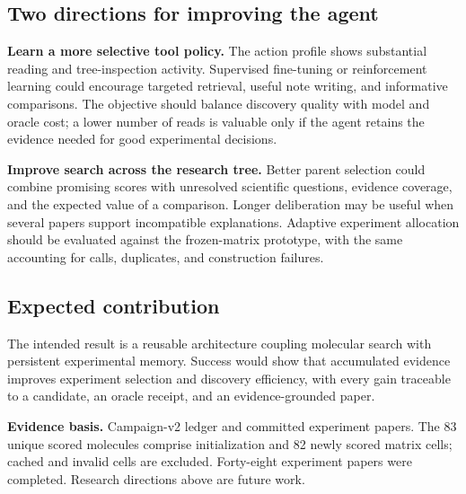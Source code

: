 \documentclass[11pt,a4paper]{article}
\begin{document}
\subsection*{Two directions for improving the agent}
\textbf{Learn a more selective tool policy.} The action profile shows substantial reading and tree-inspection activity. Supervised fine-tuning or reinforcement learning could encourage targeted retrieval, useful note writing, and informative comparisons. The objective should balance discovery quality with model and oracle cost; a lower number of reads is valuable only if the agent retains the evidence needed for good experimental decisions.

\textbf{Improve search across the research tree.} Better parent selection could combine promising scores with unresolved scientific questions, evidence coverage, and the expected value of a comparison. Longer deliberation may be useful when several papers support incompatible explanations. Adaptive experiment allocation should be evaluated against the frozen-matrix prototype, with the same accounting for calls, duplicates, and construction failures.

\subsection*{Expected contribution}
The intended result is a reusable architecture coupling molecular search with persistent experimental memory. Success would show that accumulated evidence improves experiment selection and discovery efficiency, with every gain traceable to a candidate, an oracle receipt, and an evidence-grounded paper.

\vfill
{\footnotesize\color{muted}\textbf{Evidence basis.} Campaign-v2 ledger and committed experiment papers. The 83 unique scored molecules comprise initialization and 82 newly scored matrix cells; cached and invalid cells are excluded. Forty-eight experiment papers were completed. Research directions above are future work.}
\end{document}
